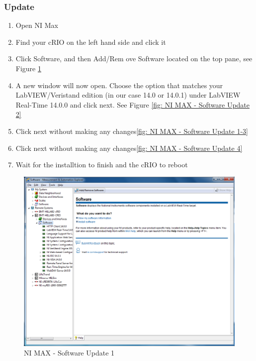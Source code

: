 \documentclass[a4paper,twoside,english]{report}
\begin{document}
\subsubsection{Update}
\begin{enumerate}
\item Open NI Max
\item Find your cRIO on the left hand side and click it
\item Click Software, and then Add/Rem ove Software located on the top pane,
see Figure \ref{fig: Software update 1}
\item A new window will now open. Choose the option that matches your LabVIEW/Veristand
edition (in our case 14.0 or 14.0.1) under LabVIEW Real-Time 14.0.0
and click next. See Figure \ref{fig: NI MAX - Software Update 2}
\item Click next without making any changes\ref{fig: NI MAX - Software Update 1-3}
\item Click next without making any changes\ref{fig: NI MAX - Software Update 4}
\item Wait for the installtion to finish and the cRIO to reboot
\end{enumerate}
\begin{figure}[!h]
\centering \includegraphics[scale=0.45]{Screenshots/Screenshot_2015-01-16_14-12-35.png}
\caption{NI MAX - Software Update 1}

\label{fig: Software update 1} 
\end{figure}
\end{document}
